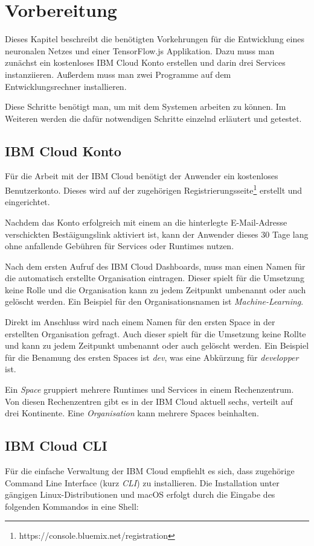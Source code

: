 \section{Vorbereitung}
Dieses Kapitel beschreibt die benötigten Vorkehrungen für die Entwicklung eines neuronalen Netzes und einer
TensorFlow.js Applikation. Dazu muss man zunächst ein kostenloses IBM Cloud Konto erstellen und darin drei Services
instanziieren. Außerdem muss man zwei Programme auf dem Entwicklungsrechner installieren.

Diese Schritte benötigt man, um mit dem Systemen arbeiten zu können. Im Weiteren werden die dafür notwendigen Schritte
einzelnd erläutert und getestet.

\subsection{IBM Cloud Konto}
Für die Arbeit mit der IBM Cloud benötigt der Anwender ein kostenloses Benutzerkonto. Dieses wird auf der zugehörigen
Registrierungsseite\footnote{https://console.bluemix.net/registration} erstellt und eingerichtet.

Nachdem das Konto erfolgreich mit einem an die hinterlegte E-Mail-Adresse verschickten Bestäigungslink aktiviert ist,
kann der Anwender dieses 30 Tage lang ohne anfallende Gebühren für Services oder Runtimes nutzen.

Nach dem ersten Aufruf des IBM Cloud Dashboards, muss man einen Namen für die automatisch erstellte Organisation
eintragen. Dieser spielt für die Umsetzung keine Rolle und die Organisation kann zu jedem Zeitpunkt umbenannt oder auch
gelöscht werden. Ein Beispiel für den Organisationsnamen ist \textit{Machine-Learning}.

Direkt im Anschluss wird nach einem Namen für den ersten Space in der erstellten Organisation gefragt. Auch dieser
spielt für die Umsetzung keine Rollte und kann zu jedem Zeitpunkt umbenannt oder auch gelöscht werden. Ein Beispiel für
die Benamung des ersten Spaces ist \textit{dev}, was eine Abkürzung für \textit{developper} ist.

Ein \textit{Space} gruppiert mehrere Runtimes und Services in einem Rechenzentrum. Von diesen Rechenzentren gibt es in
der IBM Cloud aktuell sechs, verteilt auf drei Kontinente. Eine \textit{Organisation} kann mehrere Spaces beinhalten.

\subsection{IBM Cloud CLI}
Für die einfache Verwaltung der IBM Cloud empfiehlt es sich, dass zugehörige Command Line Interface (kurz \textit{CLI})
zu installieren. Die Installation unter gängigen Linux-Distributionen und macOS erfolgt durch die Eingabe des folgenden
Kommandos in eine Shell:


